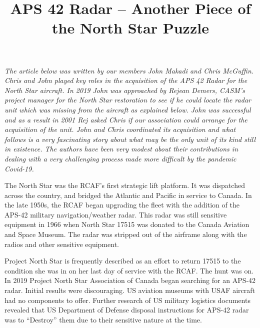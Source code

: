 %


\title{APS 42 Radar -- Another Piece of the North Star Puzzle}


\maketitle


\textit{The article below was written by our members John Makadi and Chris McGuffin. Chris and John played key roles in the acquisition of the APS 42 Radar for the North Star aircraft. In 2019 John was approached by Rejean Demers, CASM's project manager for the North Star restoration to see if he could locate the radar unit which was missing from the aircraft as explained below. John was successful and as a result in 2001  Rej asked Chris if  our association  could arrange for the acquisition of the unit. John and Chris coordinated its acquisition and what follows is a very fascinating story about what may be the only unit of its kind still in existence. The authors have been very modest about their contributions in dealing with a very challenging process made more difficult by the pandemic Covid-19.}

The North Star was the RCAF’s first strategic lift platform. It was dispatched across the country, and bridged the Atlantic and Pacific in service to Canada. In the late 1950s, the RCAF began upgrading the fleet with the addition of the APS-42 military navigation/weather radar. This radar was still sensitive equipment in 1966 when North Star 17515 was donated to the Canada Aviation and Space Museum. The radar was stripped out of the airframe along with the radios and other sensitive equipment.

Project North Star is frequently described as an effort to return 17515 to the condition she was in on her last day of service with the RCAF. The hunt was on. In 2019 Project North Star Association of Canada began searching for an APS-42 radar. Initial results were discouraging. US aviation museums with USAF aircraft had no components to offer. Further research of US military logistics documents revealed that US Department of Defense disposal instructions for APS-42 radar was to “Destroy” them due to their sensitive nature at the time.

